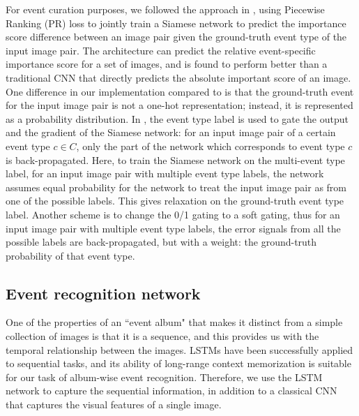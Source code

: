 \documentclass[runningheads]{llncs}
\begin{document}
For event curation purposes, we followed the approach in \cite{CVPR}, using Piecewise Ranking (PR) loss to jointly train a Siamese network to predict the importance score difference between an image pair given the ground-truth event type of the input image pair. The architecture can predict the relative event-specific importance score for a set of images, and is found to perform better than a traditional CNN that directly predicts the absolute important score of an image.
One difference in our implementation compared to \cite{CVPR} is that the ground-truth event for the input image pair  is not a one-hot representation; instead, it is represented as a probability distribution. In \cite{CVPR}, the event type label is used to gate the output and the gradient of the Siamese network: for an input image pair of a certain event type $c \in C$, only the part of the network which corresponds to event type $c$ is back-propagated.  Here, to train the Siamese network on the multi-event type label, for an input image pair with multiple event type labels, the network assumes equal probability for the network to treat the input image pair as from one of the possible labels. This gives relaxation on the ground-truth event type label. Another scheme is to change the 0/1 gating to a soft gating, thus for an input image pair with multiple event type labels, the error signals from all the possible labels are back-propagated, but with a weight: the ground-truth probability of that event type. 
%
%
%
%
%
\subsection{Event recognition network}
One of the properties of  an ``event album" that makes it distinct from a simple collection of images is that it is a sequence, and this provides us with the temporal relationship between the images. LSTMs have been successfully applied to sequential tasks, and its ability of long-range context memorization is suitable for our task of album-wise event recognition. Therefore, we use the LSTM network to capture the sequential information, in addition to a classical CNN that captures the visual features of a single image. 
\end{document}
